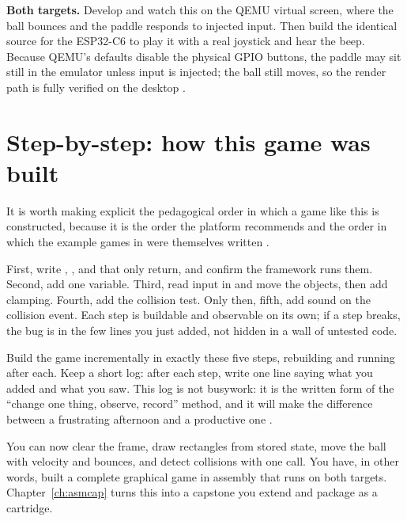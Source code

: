 \begin{prgtargets}
\textbf{Both targets.} Develop and watch this on the QEMU virtual screen, 
where the ball bounces and the paddle responds to injected input. Then 
build the identical source for the ESP32\nobreakdash-C6 to play it with 
a real joystick and hear the beep. Because QEMU's defaults disable the 
physical GPIO buttons, the paddle may sit still in the emulator unless 
input is injected; the ball still moves, so the render path is fully 
verified on the desktop \citep{prg32qemu}.
\end{prgtargets}

\section{Step-by-step: how this game was built}

It is worth making explicit the pedagogical order in which a game like this is
constructed, because it is the order the platform recommends and the order in
which the example games in  were themselves written
\citep{prg32tutorial,prg32tutorialgraphic}.

First, write , , and  that only return, 
and confirm the framework runs them. Second, add one  variable.
Third, read input in  and move the objects, then add clamping. 
Fourth, add the collision test. Only then, fifth, add sound on the collision 
event. Each step is buildable and observable on its own; if a step breaks, 
the bug is in the few lines you just added, not hidden in a wall of untested code.

\begin{prgtry}
Build the game incrementally in exactly these five steps, rebuilding and running
after each. Keep a short log: after each step, write one line saying what you
added and what you saw. This log is not busywork: it is the written form of the
``change one thing, observe, record'' method, and it will make the difference
between a frustrating afternoon and a productive one \citep{prg32repo}.
\end{prgtry}

\begin{prgcheck}
You can now clear the frame, draw rectangles from stored state, move the ball
with velocity and bounces, and detect collisions with one call. You have, in
other words, built a complete graphical game in \riscv assembly that runs on both
targets. Chapter~\ref{ch:asmcap} turns this into a capstone you extend and
package as a cartridge.
\end{prgcheck}
